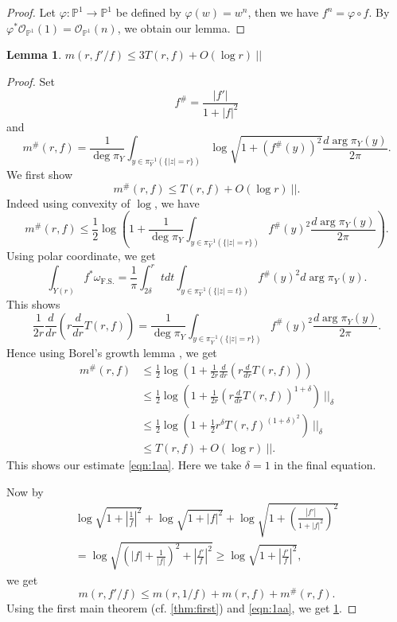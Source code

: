 \documentclass[11pt,english]{smfart}
\theoremstyle{plain}
\newtheorem{lem}[thm]{Lemma}
\theoremstyle{definition}
\theoremstyle{remark}
\numberwithin{equation}{section}
\theoremstyle{plain}
\begin{document}
	\begin{proof}
		Let $\varphi:\mathbb P^1\to\mathbb P^1$ be defined by $\varphi(w)=w^n$, then we have $f^n=\varphi\circ f$.
		By $\varphi^*\mathcal{O}_{\mathbb P^1}(1)=\mathcal{O}_{\mathbb P^1}(n)$, we obtain our lemma.
	\end{proof}
	
	\begin{lem}\label{lem:202311192}
		$m(r,f'/f)\leq 3T(r,f)+O(\log r)\ ||$
	\end{lem}
	
	\begin{proof}
		Set 
		$$
		f^{\#}=\frac{|f'|}{1+|f|^2}
		$$
		and
		$$
		m^{\#}(r,f)=\frac{1}{\deg \pi _Y}\int_{y\in \pi_Y^{-1}(\{|z|=r\})}\log \sqrt{1+(f^{\#}(y))^2} \frac{d \arg \pi _Y(y)}{2\pi}.
		$$
		We first show
		\begin{equation}\label{eqn:1aa}
			m^{\#}(r,f)\leq T(r,f)+O(\log r)\ ||.
		\end{equation}
		Indeed using convexity of $\log$, we have
		\begin{equation*}
			m^{\#}(r,f)\leq \frac{1}{2}\log \left( 1+\frac{1}{\deg \pi _Y}\int_{y\in \pi_Y^{-1}(\{|z|=r\})}f^{\#}(y)^2\frac{d \arg \pi _Y(y)}{2\pi}\right) .
		\end{equation*}
		Using polar coordinate, we get
		$$
		\int_{Y(r)}f^*\omega_{\mathrm{F.S.}}=\frac{1}{\pi}\int_{2\delta}^rtdt\int_{y\in \pi_Y^{-1}(\{|z|=t\})}f^{\#}(y)^2d\arg\pi_Y(y).
		$$
		This shows
		$$
		\frac{1}{2r}\frac{d}{dr}\left( r\frac{d}{dr}T(r,f)\right) =\frac{1}{\deg \pi _Y}\int_{y\in \pi_Y^{-1}(\{|z|=r\})}f^{\#}(y) ^2\frac{d \arg \pi _Y(y)}{2\pi}.
		$$
		Hence using Borel's growth lemma \cite[p. 13]{NW13}, we get
		\begin{equation*}
			\begin{split}
				m^{\#}(r,f)&\leq  \frac{1}{2}\log \left( 1+\frac{1}{2r}\frac{d}{dr}\left( r\frac{d}{dr}T(r,f)\right)\right) \\
				&\leq  \frac{1}{2}\log \left( 1+\frac{1}{2r}\left( r\frac{d}{dr}T(r,f)\right)^{1+\delta}
				\right) \ ||_{\delta}\\
				&\leq  \frac{1}{2}\log \left( 1+\frac{1}{2}r^{\delta}T(r,f)^{(1+\delta )^2}\right) \ ||_{\delta}\\
				&\leq  T(r,f) +O(\log r)\ ||.
			\end{split}
		\end{equation*}
		This shows our estimate \eqref{eqn:1aa}.
		Here we take $\delta =1$ in the final equation.
		
		\par
		
		Now by
		\begin{multline*}
			\log \sqrt{1+\left\vert \frac{1}{f}\right\vert^2}+\log \sqrt{1+|f|^2}+\log \sqrt{ 1+\left( \frac{|f'|}{1+|f|^2}\right) ^2}
			\\
			=\log \sqrt{ \left(|f|+\frac{1}{|f|}\right)^2+\left\vert \frac{f'}{f}\right\vert ^2} 
			\geq
			\log\sqrt{1+\left\vert \frac{f'}{f}\right\vert ^2},
		\end{multline*}
		we get
		$$
		m(r,f'/f)\leq m(r,1/f)+m(r,f )+m^{\#}(r,f).
		$$
		Using the first main theorem (cf. \cref{thm:first}) and \eqref{eqn:1aa}, we get \cref{lem:202311192}.
	\end{proof}
	
\end{document}
